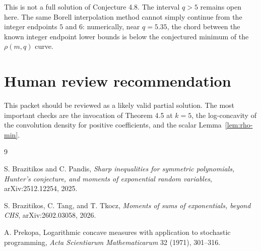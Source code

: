 \documentclass[11pt]{article}
\begin{document}
This is not a full solution of Conjecture 4.8.  The interval \(q>5\) remains
open here.  The same Borell interpolation method cannot simply continue from
the integer endpoints \(5\) and \(6\): numerically, near \(q=5.35\), the chord
between the known integer endpoint lower bounds is below the conjectured
minimum of the \(\rho(m,q)\) curve.

\section{Human review recommendation}

This packet should be reviewed as a likely valid partial solution.  The most
important checks are the invocation of Theorem 4.5 at \(k=5\), the
log-concavity of the convolution density for positive coefficients, and the
scalar Lemma~\ref{lem:rho-min}.

\begin{thebibliography}{9}

S. Brazitikos and C. Pandis,
\emph{Sharp inequalities for symmetric polynomials, Hunter's conjecture, and
moments of exponential random variables},
arXiv:2512.12254, 2025.

S. Brazitikos, C. Tang, and T. Tkocz,
\emph{Moments of sums of exponentials, beyond CHS},
arXiv:2602.03058, 2026.

A. Prekopa,
Logarithmic concave measures with application to stochastic programming,
\emph{Acta Scientiarum Mathematicarum} 32 (1971), 301--316.

\end{thebibliography}
\end{document}
